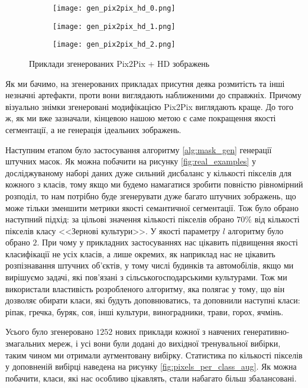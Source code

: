 \begin{figure}[ht]
    \centering
    \begin{subfigure}[b]{0.3\textwidth}
        \texttt{[image: gen\_pix2pix\_hd\_0.png]}
    \end{subfigure}
    \begin{subfigure}[b]{0.3\textwidth}
        \texttt{[image: gen\_pix2pix\_hd\_1.png]}
    \end{subfigure}
    \begin{subfigure}[b]{0.3\textwidth}
        \texttt{[image: gen\_pix2pix\_hd\_2.png]}
    \end{subfigure}
    \caption{Приклади згенерованих Pix2Pix + HD зображень}
    \label{fig:gen_pix2pix_hd_examples}
\end{figure}

Як ми бачимо, на згенерованих прикладах присутня
деяка розмитість та інші незначні артефакти, проти
вони виглядають наближеними до справжніх. Причому візуально
знімки згенеровані модифікацією Pix2Pix виглядають краще.
До того ж,
як ми вже зазначали, кінцевою нашою метою є саме покращення
якості сегментації, а не генерація ідеальних зображень.


Наступним етапом було застосування алгоритму \ref{alg:mask_gen} генерації
штучних масок. Як можна побачити на рисунку \ref{fig:real_examples}
у досліджуваному наборі даних дуже сильний дисбаланс у кількості
пікселів для кожного з класів, тому якщо ми будемо намагатися
зробити повністю рівномірний розподіл, то нам потрібно буде
згенерувати дуже багато штучних зображень, що
може тільки зменшити метрики якості семантичної сегментації.
Тож було обрано наступний підхід: за цільові значення кількості пікселів
обрано $70\%$ від кількості пікселів класу <<Зернові культури>>.
У якості параметру $l$ алгоритму було обрано $2$. При чому
у прикладних застосуваннях нас цікавить підвищення якості класифікації не усіх
класів, а лише окремих, як наприклад нас не цікавить розпізнавання
штучних об'єктів, у тому числі будинків та автомобілів,
якщо ми вирішуємо задачі, які пов'язані з сільськогосподарськими
культурами. Тож ми використали властивість розробленого алгоритму,
яка полягає у тому, що він дозволяє обирати
класи, які будуть доповнюватись, та доповнили наступні класи:
ріпак, гречка, буряк, соя, інші культури, виноградники, трави,
горох, ячмінь.

Усього було згенеровано $1252$ нових приклади кожної з навчених
генеративно-змагальних мереж, і усі вони були додані до
вихідної тренувальної вибірки, таким чином ми отримали аугментовану вибірку.
Статистика по кількості пікселів у доповненій вибірці наведена на
рисунку \ref{fig:pixels_per_class_aug}. Як можна побачити,
класи, які нас особливо цікавлять, стали набагато більш збалансовані.

